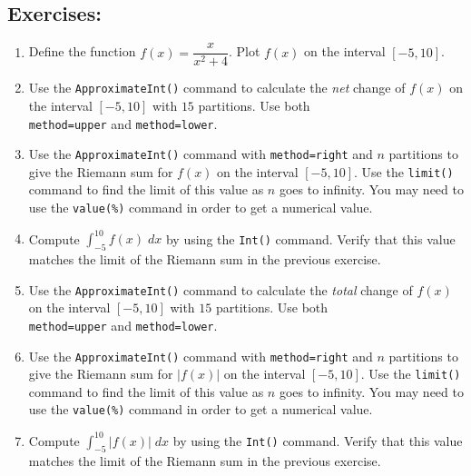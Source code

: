 \subsection*{Exercises:}

\begin{enumerate}
    \item   Define the function $f(x) = \dfrac{x}{x^2+4}$.  Plot $f(x)$ on the interval $[-5,10]$.
    \item   Use the \texttt{ApproximateInt()} command to calculate the \textit{net} change of $f(x)$ on the interval $[-5,10]$ with $15$ partitions. Use both\\ \texttt{method=upper} and \texttt{method=lower}.
    \item   Use the \texttt{ApproximateInt()} command with \texttt{method=right} and $n$ partitions to give the Riemann sum for $f(x)$ on the interval $[-5,10]$.  Use the \texttt{limit()} command to find the limit of this value as $n$ goes to infinity. You may need to use the \texttt{value(\%)} command in order to get a numerical value.
    \item   Compute $\displaystyle\int_{-5}^{10} f(x) \; dx$ by using the \texttt{Int()} command.  Verify that this value matches the limit of the Riemann sum in the previous exercise.
    \item   Use the \texttt{ApproximateInt()} command to calculate the \textit{total} change of $f(x)$ on the interval $[-5,10]$ with $15$ partitions. Use both\\ \texttt{method=upper} and \texttt{method=lower}.
    \item   Use the \texttt{ApproximateInt()} command with \texttt{method=right} and $n$ partitions to give the Riemann sum for $|f(x)|$ on the interval $[-5,10]$.  Use the \texttt{limit()} command to find the limit of this value as $n$ goes to infinity. You may need to use the \texttt{value(\%)} command in order to get a numerical value.
    \item    Compute $\displaystyle\int_{-5}^{10} |f(x)| \; dx$ by using the \texttt{Int()} command.  Verify that this value matches the limit of the Riemann sum in the previous exercise.

\end{enumerate}
